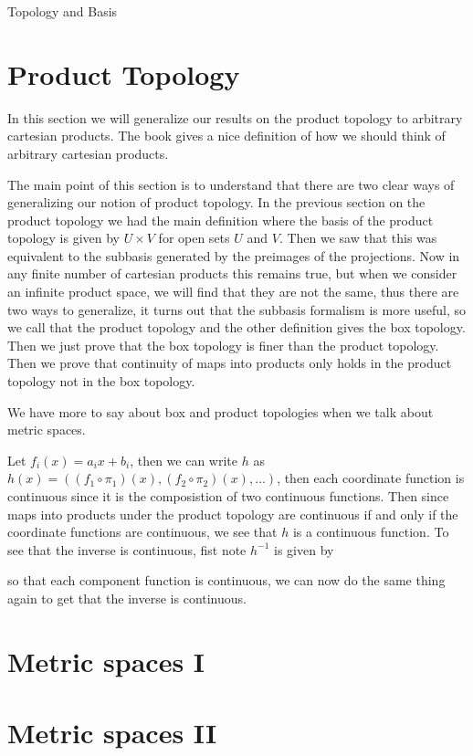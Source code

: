 \begin{chapter}{Topology and Basis}
   \section{Product Topology}
   In this section we will generalize our results on the product topology to arbitrary cartesian products. 
   The book gives a nice definition of how we should think of arbitrary cartesian products. 

   The main point of this section is to understand that there are two clear ways of generalizing our notion of product topology. 
   In the previous section on the product topology we had the main definition where the basis of the product topology 
   is given by $U \times V$ for open sets $U$ and $V$. Then we saw that this was equivalent to the subbasis generated by 
   the preimages of the projections. Now in any finite number of cartesian products this remains true, but when we consider 
   an infinite product space, we will find that they are not the same, thus there are two ways to generalize, 
   it turns out that the subbasis formalism is more useful, so we call that the product topology and the other definition gives 
   the box topology. Then we just prove that the box topology is finer than the product topology. Then we prove that 
   continuity of maps into products only holds in the product topology not in the box topology. 
   
   We have more to say about box and product topologies when we talk about metric spaces. 

   \newpage
   Let $f_i(x) = a_ix + b_i$, then we can write $h$ 
   as $h(x) = ((f_1 \circ \pi_1)(x), (f_2 \circ \pi_2)(x), \dots )$, then each coordinate function is continuous since it is the composistion of two continuous functions. Then since maps into products under the product topology are continuous 
   if and only if the coordinate functions are continuous, we see that $h$ is a continuous function. To see that the inverse is continuous, fist note $h^{-1}$ is given by 
   
   so that each component function is continuous, we can now do the same thing again to get that the inverse is continuous. 
   \newpage 

   \section{Metric spaces I }

   \section{Metric spaces II}
    
\end{chapter}
